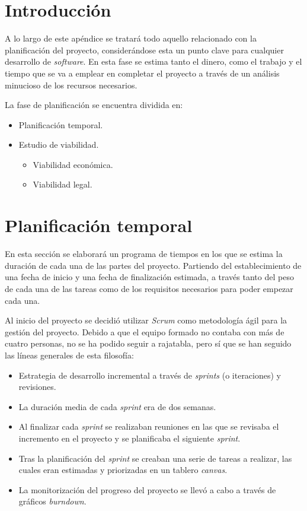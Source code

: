 
\section{Introducción}

A lo largo de este apéndice se tratará todo aquello relacionado con la planificación del proyecto, considerándose esta un punto clave para cualquier desarrollo de \textit{software}. En esta fase se estima tanto el dinero, como el trabajo y el tiempo que se va a emplear en completar el proyecto a través de un análisis minucioso de los recursos necesarios.

La fase de planificación se encuentra dividida en:

\begin{itemize}
	\item Planificación temporal.
	\item Estudio de viabilidad.
	\begin{itemize}
		\item Viabilidad económica.
		\item Viabilidad legal.
	\end{itemize}
\end{itemize}

\section{Planificación temporal}

En esta sección se elaborará un programa de tiempos en los que se estima la duración de cada una de las partes del proyecto. Partiendo del establecimiento de una fecha de inicio y una fecha de finalización estimada, a través tanto del peso de cada una de las tareas como de los requisitos necesarios para poder empezar cada una.

Al inicio del proyecto se decidió utilizar \textit{Scrum} como metodología ágil para la gestión del proyecto. Debido a que el equipo formado no contaba con más de cuatro personas, no se ha podido seguir a rajatabla, pero sí que se han seguido las líneas generales de esta filosofía:

\begin{itemize}
	\item Estrategia de desarrollo incremental a través de \textit{sprints} (o iteraciones) y revisiones.
	\item La duración media de cada \textit{sprint} era de dos semanas.
	\item Al finalizar cada \textit{sprint} se realizaban reuniones en las que se revisaba el incremento en el proyecto y se planificaba el siguiente \textit{sprint}.
	\item Tras la planificación del \textit{sprint} se creaban una serie de tareas a realizar, las cuales eran estimadas y priorizadas en un tablero \textit{canvas}.
	\item La monitorización del progreso del proyecto se llevó a cabo a través de gráficos \textit{burndown}.
\end{itemize}

